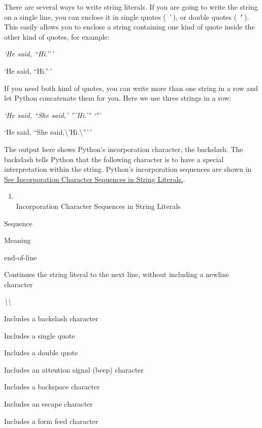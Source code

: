There are several ways to write
string literals. If you are going to write the string on a single line,
you can enclose it in single quotes ( \emph{'} ), or double quotes (
\emph{"} ). This easily allows you to enclose a string containing one
kind of quote inside the other kind of quotes, for example:


\emph{`He said, ``Hi.''\,'}

`He said, ``Hi.''\,'

If you need both kind of quotes,
you can write more than one string in a row and let Python concatenate
them for you. Here we use three strings in a row:


\emph{`He said, ``She said,' '''Hi.'" `"'}

`He said, ``She
said,\textbackslash{}'Hi.\textbackslash{}'''\,'

The output here shows Python's
incorporation character, the backslash. The backslash tells Python that
the following character is to have a special interpretation within the
string. Python's incorporation sequences are shown in
\href{chap2.html\#44479}{See Incorporation Character Sequences in String
Literals.}.

\begin{enumerate}
\tightlist
\item
  \\
  Incorporation Character Sequences in
  String Literals
\end{enumerate}

Sequence

Meaning


end-of-line

Continues the string literal to the
next line, without including a newline character


\emph{\textbackslash{}\textbackslash{}}

Includes a backslash character



Includes a single quote



Includes a double quote



Includes an attention signal (beep)
character



Includes a backspace character



Includes an escape character



Includes a form feed character



